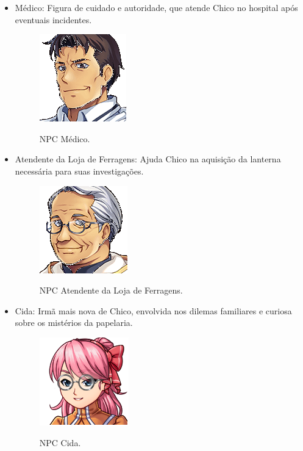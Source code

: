 \begin{itemize}
	\item Médico: Figura de cuidado e autoridade, que atende Chico no hospital após eventuais incidentes.
	      \begin{figure}[ht]
		      \centering
		      \caption{NPC Médico.}
		      \includegraphics[scale=0.8]{Textuais/Pictures/Medico.png}
		      \label{fig:npc-medico}
	      \end{figure}
	\item Atendente da Loja de Ferragens: Ajuda Chico na aquisição da lanterna necessária para suas investigações.
	      \begin{figure}[ht]
		      \centering
		      \caption{NPC Atendente da Loja de Ferragens.}
		      \includegraphics[scale=0.8]{Textuais/Pictures/Atendente_Loja_Ferragens.png}
		      \label{fig:npc-atendente-loja-ferragens}
	      \end{figure}
	\item Cida: Irmã mais nova de Chico, envolvida nos dilemas familiares e curiosa sobre os mistérios da papelaria.
	      \begin{figure}[ht]
		      \centering
		      \caption{NPC Cida.}
		      \includegraphics[scale=0.8]{Textuais/Pictures/Cida.png}
		      \label{fig:npc-cida}
	      \end{figure}
\end{itemize}

